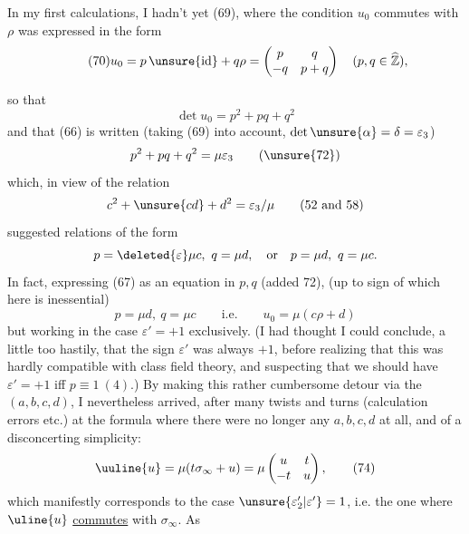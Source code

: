 In my first calculations, I hadn't yet  (69), where the condition $u_0$ commutes with $\rho$ was expressed in the form
\[
\tag{70}u_0=p\,\unsure{\mathrm{id}}+q\rho=\begin{pmatrix}p&q\\-q&p+q\end{pmatrix}\quad(p,q\in\widehat{\mathbb Z}),
\]


so that
\[
\det u_0=p^2+pq+q^2
\tag{71}
\]
and that (66) is written (taking (69) into account, 
$\det\unsure{\alpha}=\delta=\varepsilon_3$)
\[
p^2+pq+q^2=\mu\varepsilon_3
\tag{\unsure{72}}
\]
which, in view of the relation
\[
c^2+\unsure{cd}+d^2=\varepsilon_3/\mu
\qquad(52\text{ and }58)
\]
suggested relations of the form
\[
p=\deleted{\varepsilon}\mu c,\ q=\mu d,\quad
\text{or}\quad p=\mu d,\ q=\mu c.
\]
In fact, expressing (67) as an equation in $p,q$
(added  72), 
(up to sign of 
which here is inessential)
\[
p=\mu d,\ q=\mu c\qquad\text{i.e.}\qquad u_0=\mu(c\rho+d)
\tag{73}
\]
but working in the case $\varepsilon'=+1$ exclusively.
(I had thought I could conclude, a little too hastily, that the
sign $\varepsilon'$ was always $+1$, before realizing
that this was hardly compatible with class
field theory, and suspecting that we should have $\varepsilon'=+1$
iff $p\equiv1\ (4)$.) By making this rather cumbersome detour
via the $(a,b,c,d)$, I nevertheless arrived, after
many twists and turns (calculation errors etc.) at the
formula where there were no longer any $a,b,c,d$ at all,
and of a disconcerting simplicity:
\[
\uuline{u}=\mu(t\sigma_\infty+u)
=\mu\begin{pmatrix}u&t\\-t&u\end{pmatrix},
\tag{74}
\]
which manifestly corresponds to the case $\unsure{\varepsilon'_2|\varepsilon'}=1$, i.e.
the one where $\uline{u}$ \uline{commutes} with $\sigma_\infty$. As

